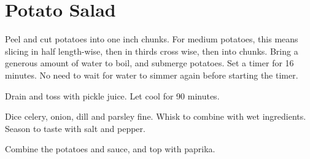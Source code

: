 \section{Potato Salad}
\begin{recipe}



Peel and cut potatoes into one inch chunks. For medium potatoes, this means slicing in half length-wise, then in thirds cross wise, then into chunks.
Bring a generous amount of water to boil, and submerge potatoes. Set a timer for 16 minutes. No need to wait for water to simmer again before starting the timer.


Drain and toss with pickle juice. Let cool for 90 minutes.


Dice celery, onion, dill and parsley fine. Whisk to combine with wet ingredients.
Season to taste with salt and pepper.


Combine the potatoes and sauce, and top with paprika.

\end{recipe}
